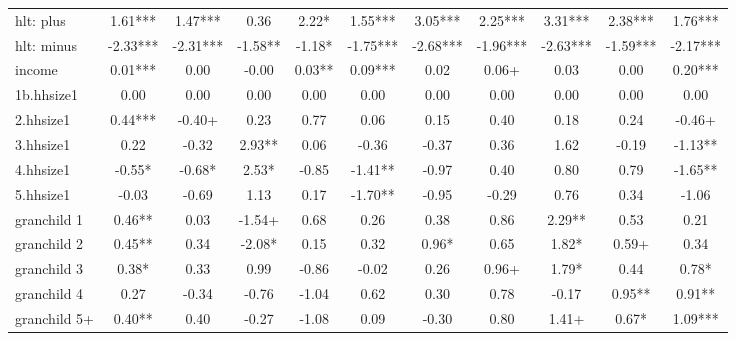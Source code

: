 {\begin{tabular}{l*{10}{c}}
hlt: plus   &        1.61***&        1.47***&        0.36   &        2.22*  &        1.55***&        3.05***&        2.25***&        3.31***&        2.38***&        1.76***\\
hlt: minus  &       -2.33***&       -2.31***&       -1.58** &       -1.18*  &       -1.75***&       -2.68***&       -1.96***&       -2.63***&       -1.59***&       -2.17***\\
income      &        0.01***&        0.00   &       -0.00   &        0.03** &        0.09***&        0.02   &        0.06+  &        0.03   &        0.00   &        0.20***\\
1b.hhsize1  &        0.00   &        0.00   &        0.00   &        0.00   &        0.00   &        0.00   &        0.00   &        0.00   &        0.00   &        0.00   \\
2.hhsize1   &        0.44***&       -0.40+  &        0.23   &        0.77   &        0.06   &        0.15   &        0.40   &        0.18   &        0.24   &       -0.46+  \\
3.hhsize1   &        0.22   &       -0.32   &        2.93** &        0.06   &       -0.36   &       -0.37   &        0.36   &        1.62   &       -0.19   &       -1.13** \\
4.hhsize1   &       -0.55*  &       -0.68*  &        2.53*  &       -0.85   &       -1.41** &       -0.97   &        0.40   &        0.80   &        0.79   &       -1.65** \\
5.hhsize1   &       -0.03   &       -0.69   &        1.13   &        0.17   &       -1.70** &       -0.95   &       -0.29   &        0.76   &        0.34   &       -1.06   \\
granchild 1 &        0.46** &        0.03   &       -1.54+  &        0.68   &        0.26   &        0.38   &        0.86   &        2.29** &        0.53   &        0.21   \\
granchild 2 &        0.45** &        0.34   &       -2.08*  &        0.15   &        0.32   &        0.96*  &        0.65   &        1.82*  &        0.59+  &        0.34   \\
granchild 3 &        0.38*  &        0.33   &        0.99   &       -0.86   &       -0.02   &        0.26   &        0.96+  &        1.79*  &        0.44   &        0.78*  \\
granchild 4 &        0.27   &       -0.34   &       -0.76   &       -1.04   &        0.62   &        0.30   &        0.78   &       -0.17   &        0.95** &        0.91** \\
granchild 5+&        0.40** &        0.40   &       -0.27   &       -1.08   &        0.09   &       -0.30   &        0.80   &        1.41+  &        0.67*  &        1.09***\\

\end{tabular}}
